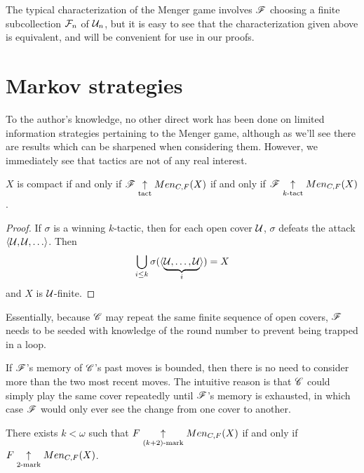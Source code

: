 The typical characterization of the Menger game involves $\mathscr{F}$ choosing
a finite subcollection $\mathcal{F}_n$ of $\mathcal{U}_n$, but it is easy to see that the
characterization given above is equivalent, and will be convenient for use
in our proofs.


\section{Markov strategies}

To the author's knowledge, no other direct work has been done on limited
information strategies pertaining to the Menger game, although as we'll see
there are results which can be sharpened when considering them.
However, we immediately see that tactics are not of any real interest.

\begin{prop}
  $X$ is compact if and only if
  $\mathscr{F} \underset{\text{tact}}{\uparrow} Men_{C,F}(X)$ if and only if
  $\mathscr{F} \underset{k\text{-tact}}{\uparrow} Men_{C,F}(X)$.
\end{prop}

\begin{proof}
  If $\sigma$ is a winning $k$-tactic, then for each open cover $\mathcal{U}$,
  $\sigma$ defeats the attack $\<\mc U,\mc U,\dots\>$. Then
  \[
    \bigcup_{i\leq k} \sigma(\langle\underbrace{\mathcal{U},\dots,\mathcal{U}}_i\rangle) = X
  \]
  and $X$ is $\mathcal{U}$-finite.
\end{proof}

Essentially, because $\mathscr{C}$ may repeat the same finite sequence of open covers,
$\mathscr{F}$ needs to be seeded with knowledge of the round number to prevent being
trapped in a loop.

If $\mathscr{F}$'s memory of $\mathscr{C}$'s past moves is bounded, then
there is no need to consider more than the two most recent moves. The
intuitive reason is that $\mathscr{C}$ could simply play the same cover repeatedly
until $\mathscr{F}$'s memory is exhausted, in which case $\mathscr{F}$ would only ever
see the change from one cover to another.

\begin{thm}
  There exists $k<\omega$ such that $F \underset{(k+2)\text{-mark}}{\uparrow} Men_{C,F}(X)$
  if and only if $F \underset{2\text{-mark}}{\uparrow} Men_{C,F}(X)$.
\end{thm}

